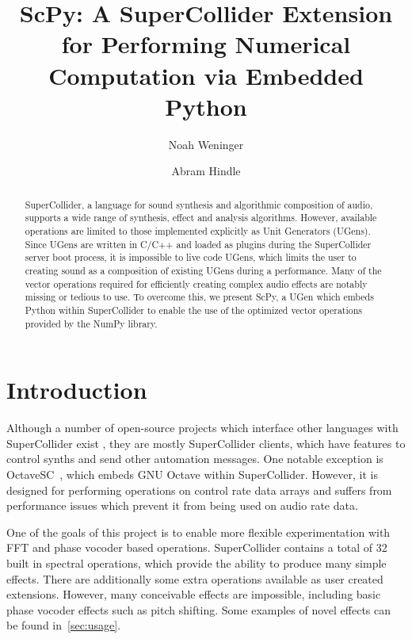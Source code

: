 \documentclass{article}
\begin{document}
\title{ScPy: A SuperCollider Extension for Performing Numerical Computation via Embedded Python}

\author{Noah Weninger \and Abram Hindle}

\maketitle

\begin{abstract}

    SuperCollider, a language for sound synthesis and algorithmic composition of audio, supports a
    wide range of synthesis, effect and analysis algorithms. However, available operations are
    limited to those implemented explicitly as Unit Generators (UGens). Since UGens are written in
    C/C++ and loaded as plugins during the SuperCollider server boot process, it is impossible to
    live code UGens, which limits the user to creating sound as a composition of existing UGens
    during a performance. Many of the vector operations required for efficiently creating complex
    audio effects are notably missing or tedious to use. To overcome this, we present ScPy, a UGen
    which embeds Python within SuperCollider to enable the use of the optimized vector operations
    provided by the NumPy library.

\end{abstract}

\section{Introduction}\label{sec:introduction}

Although a number of open-source projects which interface other languages with SuperCollider exist
\cite{systemsinterfacingwithsc,magnusson2011ixi,orlarey2009faust}, they are mostly SuperCollider
clients, which have features to control synths and send other automation messages. One notable
exception is OctaveSC~\cite{octavesc}, which embeds GNU Octave within SuperCollider. However, it
is designed for performing operations on control rate data arrays and suffers from performance
issues which prevent it from being used on audio rate data.

One of the goals of this project is to enable more flexible experimentation with FFT and phase
vocoder based operations. SuperCollider contains a total of 32 built in spectral operations,
which provide the ability to produce many simple effects. There are additionally some extra
operations available as user created extensions. However, many conceivable effects are impossible,
including basic phase vocoder effects such as pitch shifting. Some examples of novel effects can
be found in~\autoref{sec:usage}.
\end{document}
